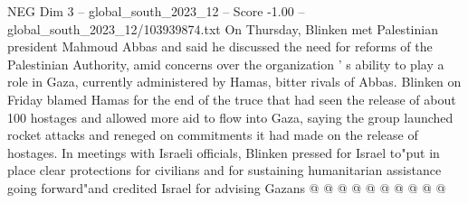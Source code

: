 \begin{textsample}{NEG Dim 3 – global\_south\_2023\_12 – Score -1.00 – global\_south\_2023\_12/103939874.txt}
On Thursday, Blinken met Palestinian president Mahmoud Abbas and said he discussed the need for reforms of the Palestinian Authority, amid concerns over the organization ' s ability to play a role in Gaza, currently administered by Hamas, bitter rivals of Abbas.
Blinken on Friday blamed Hamas for the end of the truce that had seen the release of about 100 hostages and allowed more aid to flow into Gaza, saying the group launched rocket attacks and reneged on commitments it had made on the release of hostages.
In meetings with Israeli officials, Blinken pressed for Israel to"put in place clear protections for civilians and for sustaining humanitarian assistance going forward"and credited Israel for advising Gazans @ @ @ @ @ @ @ @ @ @

\end{textsample}
